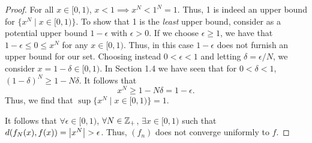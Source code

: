 \begin{solution}
\begin{proof}
    For all $x \in [0, 1)$, $x < 1 \implies x^N < 1^N = 1$.
    Thus, 1 is indeed an upper bound for $\{x^N \mid x \in [0, 1)\}$.
    To show that 1 is the \textit{least} upper bound, consider as a potential upper bound $1 - \epsilon$ with $\epsilon > 0$.
    If we choose $\epsilon \geq 1$, we have that $1 - \epsilon \leq 0 \leq x^N$ for any $x \in [0, 1)$.
    Thus, in this case $1 - \epsilon$ does not furnish an upper bound for our set.
    Choosing instead $0 < \epsilon < 1$ and letting $\delta = \epsilon / N$, we consider $x = 1 - \delta \in [0, 1)$.
    In Section 1.4 we have seen that for $0 < \delta < 1$, $(1 - \delta)^N \geq 1 - N \delta$.
    It follows that
    \begin{equation*}
      x^N \geq 1 - N \delta = 1 - \epsilon.
    \end{equation*}
    Thus, we find that $\sup\{x^N \mid x \in [0, 1)\} = 1$.

    It follows that $\forall \epsilon \in [0, 1)$, $\forall N \in \mathbb{Z}_+$, $\exists x \in [0, 1)$ such that $d(f_N(x), f(x)) = \left| x^N \right| > \epsilon$.
    Thus, $(f_n)$ does not converge uniformly to $f$.
  \end{proof}
\end{solution}
